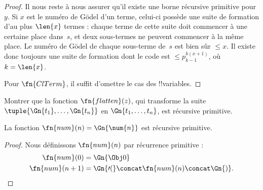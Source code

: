 \documentclass[../../../include/open-logic-section]{subfiles}
\begin{document}
\begin{proof}
Il nous reste à nous assurer qu'il existe une borne récursive
primitive pour~$y$. Si $x$ est le numéro de G\"odel d'un terme,
celui-ci possède une suite de formation d'au plus $\len{x}$ termes :
chaque terme de cette suite doit commencer à une certaine place
dans~$s$, et deux sous-termes ne peuvent commencer à la même place.
Le numéro de G\"odel de chaque sous-terme de~$s$ est bien sûr
$\le x$. Il existe donc toujours une suite de formation dont le code
est $\le p_{k-1}^{k(x+1)}$, où $k=\len{x}$.

Pour $\fn{ClTerm}$, il suffit d'omettre le cas des !!{variable}s.
\end{proof}

\begin{prob}
Montrer que la fonction $\fn{flatten}(z)$, qui transforme la suite
$\tuple{\Gn{t_1}, \dots, \Gn{t_n}}$ en $\Gn{t_1, \dots, t_n}$, est
récursive primitive.
\end{prob}

\begin{prop}
  La fonction $\fn{num}(n) = \Gn{\num{n}}$ est récursive primitive.
\end{prop}

\begin{proof}
  Nous définissons $\fn{num}(n)$ par récurrence primitive :
  \begin{align*}
    \fn{num}(0) & = \Gn{\Obj 0}\\
    \fn{num}(n+1) & = \Gn{\prime(} \concat \fn{num}(n) \concat \Gn{)}.
  \end{align*}
\end{proof}
\end{document}
